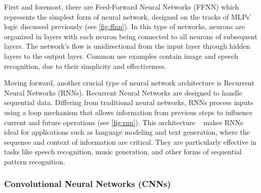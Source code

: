 First and foremost, there are Feed-Forward Neural Networks (FFNN)\cite{leshnoMultilayerFeedforwardNetworks1993} which represents the simplest form of
neural network, designed on the tracks of MLPs' logic discussed previously (see \cref{fig:ffnn}). In this type of networks, neurons are organized
in layers with each neuron being connected to all neurons of subsequent layers. The network's flow is unidirectional from the input layer through hidden
layers to the output layer. Common use examples contain image and speech recognition, due to their simplicity and effectiveness.

Moving forward, another crucial type of neural network architecture is Recurrent Neural Networks (RNNs)\cite{communityUnderstandingMechanismTypes2020}.
Recurrent Neural Networks are designed to handle sequential data\cite{ghiassiDynamicArtificialNeural2005}. Differing from traditional neural networks, RNNs process inputs
using a loop mechanism that allows information from previous steps to influence current and future operations (see \cref{fig:rnn}). This architecture
~\cite{osheaIntroductionConvolutionalNeural2015} makes RNNs ideal for applications such as language modeling and text generation, where the sequence and context
of information are critical. They are particularly effective in tasks like speech recognition, music generation, and other forms of sequential pattern recognition.

\subsubsection{Convolutional Neural Networks (CNNs)}
\label{sec:cnn}

